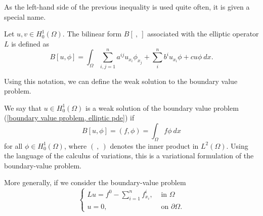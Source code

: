 \documentclass[10pt]{article}
\begin{document}
As the left-hand side of the previous inequality is used quite often, it is given a special name. 
\begin{definition}
	Let $u,v \in H_0^1(\Omega)$. The bilinear form $B[\:,\:]$ associated with the elliptic operator $L$ is defined as 
	\begin{equation*}
		\displaystyle B[u,\phi] = \int_{\Omega}{\sum\limits_{i,j=1}^{n}{a^{ij}u_{x_i}}\phi_{x_j} + \sum\limits_{i}^{n}{b^{i}u_{x_i}}\phi + cu\phi \: dx}.
	\end{equation*}
\end{definition}
Using this notation, we can define the weak solution to the boundary value problem.
\begin{definition}
	We say that $u \in H_0^1(\Omega)$ is a weak solution of the boundary value problem (\ref{boundary value problem, elliptic pde}) if 
	\begin{equation*}
		\displaystyle B[u,\phi] = (f,\phi) = \int_{\Omega}{f\phi \: dx}
	\end{equation*}
	for all $\phi \in H_0^1(\Omega)$, where $(\:,\:)$ denotes the inner product in $L^2(\Omega)$. Using the language of the calculus of variations, this is a variational formulation of the boundary-value problem.
\end{definition}
More generally, if we consider the boundary-value problem 
\begin{equation*}
	\displaystyle \begin{cases}
		Lu = f^0 - \sum\limits_{i = 1}^{n}{f^i_{x_i}}, & \textrm{ in } \Omega \\
		u = 0, & \textrm{ on } \partial \Omega. 
	\end{cases}
\end{equation*}
\end{document}

